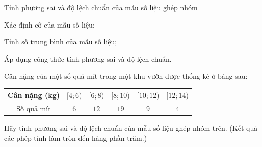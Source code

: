 \begin{dang}{Tính phương sai và độ lệch chuẩn của mẫu số liệu ghép nhóm}
	\begin{listEX}[1]
		\item [\ding{172}] Xác định cỡ của mẫu số liệu;
		\item [\ding{173}] Tính số trung bình của mẫu số liệu;
		\item [\ding{174}] Áp dụng công thức tính phương sai và độ lệch chuẩn.
	\end{listEX}
\end{dang}
\setcounter{vd}{0}
\setcounter{ex}{0}
\viduminhhoa
\begin{vd}
	Cân nặng của một số quả mít trong một khu vườn được thống kê ở bảng sau:
	\begin{center}
		\begin{tabular}{|c|c|c|c|c|c|}
			\hline Cân nặng (kg) & {$[4; 6)$} & {$[6; 8)$} & {$[8; 10)$} & {$[10; 12)$} & {$[12; 14)$} \\
			\hline Số quả mít    & $ 6 $      & $ 12 $     & $ 19 $      & $ 9 $        & $ 4 $        \\
			\hline
		\end{tabular}
	\end{center}
	Hãy tính phương sai và độ lệch chuẩn của mẫu số liệu ghép nhóm trên. (Kết quả các phép tính làm tròn đến hàng phần trăm.)
\end{vd}

